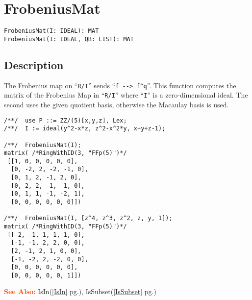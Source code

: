 \documentclass[a4paper]{mybook}
\newenvironment{command}{}{} %
\newcommand\SeeAlso{\par\textcolor{OrangeRed}{\textbf{\large See Also: }}}
\begin{document}
\section{FrobeniusMat}
\label{FrobeniusMat}
\begin{command} %


\begin{Verbatim}[label=syntax, rulecolor=\color{MidnightBlue},
frame=single]
FrobeniusMat(I: IDEAL): MAT
FrobeniusMat(I: IDEAL, QB: LIST): MAT
\end{Verbatim}


\subsection*{Description}

The Frobenius map on ``\verb&R/I&'' sends ``\verb&f --> f^q&''.
This function computes the matrix of the Frobenius Map in ``\verb&R/I&'' where
``\verb&I&'' is a zero-dimensional ideal.  The second uses the given quotient
basis, otherwise the Macaulay basis is used.
\begin{Verbatim}[label=example, rulecolor=\color{PineGreen}, frame=single]
/**/  use P ::= ZZ/(5)[x,y,z], Lex;
/**/  I := ideal(y^2-x*z, z^2-x^2*y, x+y+z-1);

/**/  FrobeniusMat(I);
matrix( /*RingWithID(3, "FFp(5)")*/
 [[1, 0, 0, 0, 0, 0],
  [0, -2, 2, -2, -1, 0],
  [0, 1, 2, -1, 2, 0],
  [0, 2, 2, -1, -1, 0],
  [0, 1, 1, -1, -2, 1],
  [0, 0, 0, 0, 0, 0]])

/**/  FrobeniusMat(I, [z^4, z^3, z^2, z, y, 1]);
matrix( /*RingWithID(3, "FFp(5)")*/
 [[-2, -1, 1, 1, 1, 0],
  [-1, -1, 2, 2, 0, 0],
  [2, -1, 2, 1, 0, 0],
  [-1, -2, 2, -2, 0, 0],
  [0, 0, 0, 0, 0, 0],
  [0, 0, 0, 0, 0, 1]])
\end{Verbatim}


\SeeAlso %
  IsIn(\ref{IsIn} pg.\pageref{IsIn}), 
    IsSubset(\ref{IsSubset} pg.\pageref{IsSubset})
\end{command} %
\end{document}
